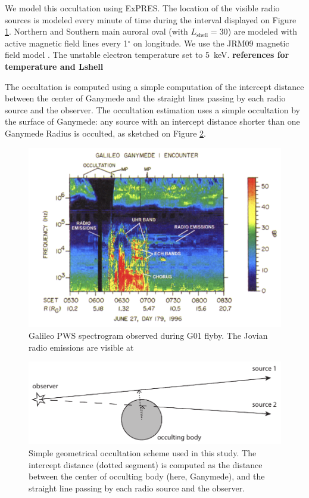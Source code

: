 \documentclass[referee]{aa}
\begin{document}
We model this occultation using ExPRES. The location of the visible radio sources is modeled every minute of time during the interval displayed on Figure \ref{fig:g01}. Northern and Southern main auroral oval (with $L_\textrm{shell}=30$) are modeled with active magnetic field lines every 1$^\circ$ on longitude. We use the JRM09 magnetic field model \citep{Connerney:2018jx}. The unstable electron temperature set to 5~keV. {\bf references for temperature and Lshell}

The occultation is computed using a simple computation of the intercept distance between the center of Ganymede and the straight lines passing by each radio source and the observer. The occultation estimation uses a simple occultation by the surface of Ganymede: any source with an intercept distance shorter than one Ganymede Radius is occulted, as sketched on Figure \ref{fig:occult}.


\begin{figure}
\includegraphics[width=\linewidth]{gll-g01.png}
\caption{Galileo PWS spectrogram observed during G01 flyby. The Jovian radio emissions are visible at }\label{fig:g01}
\end{figure}

\begin{figure}
\includegraphics[width=0.7\linewidth]{occult.pdf}
\caption{Simple geometrical occultation scheme used in this study. The intercept distance (dotted segment) is computed as the distance between the center of occulting body (here, Ganymede), and the straight line passing by each radio source and the observer.}\label{fig:occult}
\end{figure}



\end{document}
